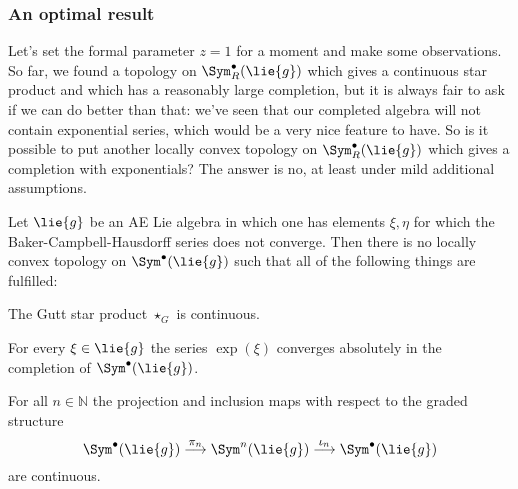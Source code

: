 \subsubsection*{An optimal result}
Let's set the formal parameter $z = 1$ for a moment and make some 
observations. So far, we found a topology on $\Sym_R^{\bullet}(\lie{g})$ which 
gives a continuous star product and which has a reasonably large completion, 
but it is always fair to ask if we can do better than that: we've seen that 
our completed algebra will not contain exponential series, which would be a 
very nice feature to have. So is it possible to put another locally convex 
topology on $\Sym_R^{\bullet}(\lie{g})$ which gives a completion with 
exponentials? The answer is no, at least under mild additional assumptions. 
\begin{proposition}
	\label{Prop:LCAna:NoBetterTopology}
	Let $\lie{g}$ be an AE Lie algebra in which one has elements $\xi, \eta$ 
	for which the Baker-Campbell-Hausdorff series does not converge. 
	Then there is no locally convex topology on $\Sym^{\bullet}(\lie{g})$ 
	such that all of the following things are fulfilled:
	\begin{propositionlist}
		\item
		The Gutt star product $\star_G$ is continuous.
		\item
		For every $\xi \in \lie{g}$ the series $\exp(\xi)$ converges 
		absolutely in the completion of $\Sym^{\bullet}(\lie{g})$.
		\item
		For all $n \in \mathbb{N}$ the projection and inclusion maps with 
		respect to the graded structure
		\begin{equation*}
			\Sym^{\bullet}(\lie{g})
	    		\ot{$\pi_n$}{\longrightarrow}
    	    		\Sym^n(\lie{g})
	    	    	\ot{$\iota_n$}{\longrightarrow}
	    		\Sym^{\bullet}(\lie{g})
		\end{equation*}
		are continuous.
	\end{propositionlist}
\end{proposition}
